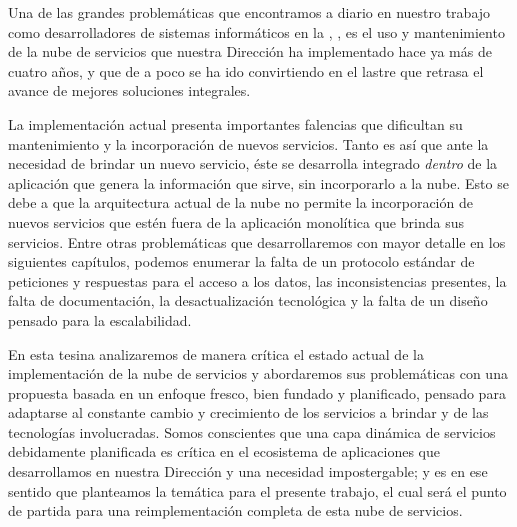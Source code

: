
Una de las grandes problemáticas que encontramos a diario en nuestro trabajo como desarrolladores de sistemas informáticos en la \direccionDesarrollo, \unlp, es el uso y mantenimiento de la nube de servicios que nuestra Dirección ha implementado hace ya más de cuatro años, y que de a poco se ha ido convirtiendo en el lastre que retrasa el avance de mejores soluciones integrales.

La implementación actual presenta importantes falencias que dificultan su mantenimiento y la incorporación de nuevos servicios. Tanto es así que ante la necesidad de brindar un nuevo servicio, éste se desarrolla integrado \textit{dentro} de la aplicación que genera la información que sirve, sin incorporarlo a la nube. Esto se debe a que la arquitectura actual de la nube no permite la incorporación de nuevos servicios que estén fuera de la aplicación monolítica que brinda sus servicios. Entre otras problemáticas que desarrollaremos con mayor detalle en los siguientes capítulos, podemos enumerar la falta de un protocolo estándar de peticiones y respuestas para el acceso a los datos, las inconsistencias presentes, la falta de documentación, la desactualización tecnológica y la falta de un diseño pensado para la escalabilidad.

En esta tesina analizaremos de manera crítica el estado actual de la implementación de la nube de servicios y abordaremos sus problemáticas con una propuesta basada en un enfoque fresco, bien fundado y planificado, pensado para adaptarse al constante cambio y crecimiento de los servicios a brindar y de las tecnologías involucradas. Somos conscientes que una capa dinámica de servicios debidamente planificada es crítica en el ecosistema de aplicaciones que desarrollamos en nuestra Dirección y una necesidad impostergable; y es en ese sentido que planteamos la temática para el presente trabajo, el cual será el punto de partida para una reimplementación completa de esta nube de servicios.
